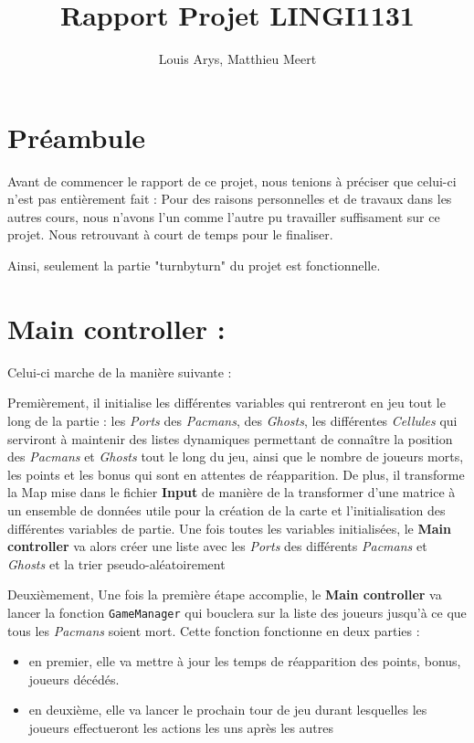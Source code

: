 \documentclass[a4paper, 11pt]{article}
\date
\author{Louis Arys, Matthieu Meert}
\title{Rapport Projet LINGI1131}
\begin{document}
\maketitle
\tableofcontents

\section{Préambule}

Avant de commencer le rapport de ce projet, nous tenions à préciser que celui-ci n'est pas entièrement fait : Pour des raisons personnelles et de travaux dans les autres cours, nous n'avons l'un comme l'autre pu travailler suffisament sur ce projet.  Nous retrouvant à court de temps pour le finaliser.

Ainsi, seulement la partie "turnbyturn" du projet est fonctionnelle.

\section{Main controller :}

Celui-ci marche de la manière suivante : 

Premièrement, il initialise les différentes variables qui rentreront en jeu tout le long de la partie : les \textit{Ports} des \textit{Pacmans}, des \textit{Ghosts}, les différentes \textit{Cellules} qui serviront à maintenir des listes dynamiques permettant de connaître la position des \textit{Pacmans} et \textit{Ghosts} tout le long du jeu, ainsi que le nombre de joueurs morts, les points et les bonus qui sont en attentes de réapparition.  De plus, il transforme la Map mise dans le fichier \textbf{Input} de manière de la transformer d'une matrice à un ensemble de données utile pour la création de la carte et l'initialisation des différentes variables de partie.  Une fois toutes les variables initialisées, le \textbf{Main controller} va alors créer une liste avec les \textit{Ports} des différents \textit{Pacmans} et \textit{Ghosts} et la trier pseudo-aléatoirement

Deuxièmement, Une fois la première étape accomplie, le \textbf{Main controller} va lancer la fonction \texttt{GameManager} qui bouclera sur la liste des joueurs jusqu'à ce que tous les \textit{Pacmans} soient mort.  Cette fonction fonctionne en deux parties :

\begin{itemize}
\item en premier, elle va mettre à jour les temps de réapparition des points, bonus, joueurs décédés.
\item en deuxième, elle va lancer le prochain tour de jeu durant lesquelles les joueurs effectueront les actions les uns après les autres
\end{itemize}
\end{document}
